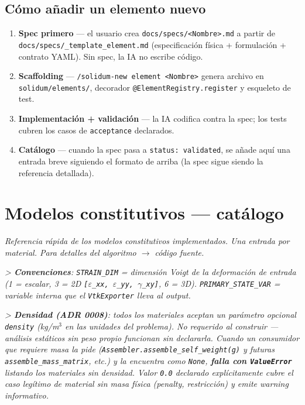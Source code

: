 \documentclass[11pt,letterpaper,oneside]{report}
\begin{document}
\section{Cómo añadir un elemento nuevo}

\begin{enumerate}
  \item \textbf{Spec primero} --- el usuario crea \texttt{docs/specs/<Nombre>.md} a partir de \texttt{docs/specs/\_template\_element.md} (especificación física + formulación + contrato YAML). Sin spec, la IA no escribe código.
  \item \textbf{Scaffolding} --- \texttt{/solidum-new element <Nombre>} genera archivo en \texttt{solidum/elements/}, decorador \texttt{@ElementRegistry.register} y esqueleto de test.
  \item \textbf{Implementación + validación} --- la IA codifica contra la spec; los tests cubren los casos de \texttt{acceptance} declarados.
  \item \textbf{Catálogo} --- cuando la spec pasa a \texttt{status: validated}, se añade aquí una entrada breve siguiendo el formato de arriba (la spec sigue siendo la referencia detallada).
\end{enumerate}


\newpage

\chapter{Modelos constitutivos — catálogo}



\textit{Referencia rápida de los modelos constitutivos implementados. Una entrada por material. Para detalles del algoritmo \ensuremath{\to} código fuente.}

\textit{> \textbf{Convenciones}: \texttt{STRAIN\_DIM} = dimensión Voigt de la deformación de entrada (1 = escalar, 3 = 2D \texttt{[\ensuremath{\varepsilon}\_xx, \ensuremath{\varepsilon}\_yy, \ensuremath{\gamma}\_xy]}, 6 = 3D). \texttt{PRIMARY\_STATE\_VAR} = variable interna que el \texttt{VtkExporter} lleva al output.}

\textit{> \textbf{Densidad (ADR 0008)}: todos los materiales aceptan un parámetro opcional \texttt{density} (kg/m\ensuremath{^{3}} en las unidades del problema). No requerido al construir --- análisis estáticos sin peso propio funcionan sin declararla. Cuando un consumidor que requiere masa la pide (\texttt{Assembler.assemble\_self\_weight(g)} y futuras \texttt{assemble\_mass\_matrix}, etc.) y la encuentra como \texttt{None}, \textbf{falla con \texttt{ValueError}} listando los materiales sin densidad. Valor \texttt{0.0} declarado explícitamente cubre el caso legítimo de material sin masa física (penalty, restricción) y emite warning informativo.}
\end{document}
